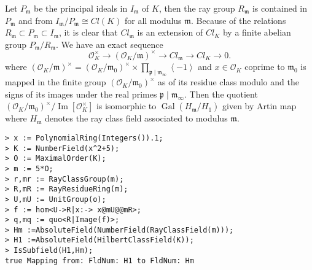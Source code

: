 \documentclass{article}
\theoremstyle{break}
\def\Gal{\mathop{\mathrm{Gal}}\nolimits}
\def\Gal{\mathop{\mathrm{Gal}}\nolimits}
\def\im{\mathop{\mathrm{Im}}\nolimits}
\def\Frob{\mathop{\mathrm{Frob}}\nolimits}
\def\Gal{\mathop{\mathrm{Gal}}\nolimits}
\begin{document}
Let $P_{\mathfrak{m}}$ be the principal ideals in $I_{\mathfrak{m}}$ of $K$, then the ray group $R_{\mathfrak{m}}$ is contained in $P_{\mathfrak{m}}$ and from \cite{Cohen1} $I_{\mathfrak{m}}/P_{\mathfrak{m}}\cong Cl(K)$ for all modulus $\mathfrak{m}$. Because of the relations $R_{\mathfrak{m}}\subset P_{\mathfrak{m}} \subset I_{\mathfrak{m}}$, it is clear that $Cl_{\mathfrak{m}}$ is an extension of $Cl_{K}$ by a finite abelian group $P_{\mathfrak{m}}/R_{\mathfrak{m}}$. We have an exact sequence
\[\mathcal{O}^{\times}_{K} \rightarrow (\mathcal{O}_{K}/{\mathfrak{m}})^{\times} \rightarrow Cl_{\mathfrak{m}} \rightarrow Cl_{K} \rightarrow 0 . \]
where $ (\mathcal{O}_{K}/{\mathfrak{m}})^{\times} = (\mathcal{O}_{K}/{\mathfrak{m}_{0}})^{\times} \times \prod_{\mathfrak{p}\mid \mathfrak{m}_{\infty}}^{}\left\langle -1 \right\rangle$ and $x\in \mathcal{O}_{K}$ coprime to $\mathfrak{m}_{0}$ is mapped in the finite group $ (\mathcal{O}_{K}/{\mathfrak{m}_{0}})^{\times}$ as of its residue class modulo and the signs of its images under the real primes $\mathfrak{p}\mid \mathfrak{m}_{\infty}$. Then the quotient $(\mathcal{O}_{K}/{\mathfrak{m}_{0}})^{\times}/ \im[\mathcal{O}^{\times}_{K}]$  is isomorphic to $\Gal(H_{\mathfrak{m}}/H_{1}) $ given by Artin map where $H_{\mathfrak{m}}$ denotes the ray class field associated to modulus $\mathfrak{m}$.\\
\begin{lstlisting}
> x := PolynomialRing(Integers()).1;
> K := NumberField(x^2+5);
> O := MaximalOrder(K);
> m := 5*O;
> r,mr := RayClassGroup(m);    
> R,mR := RayResidueRing(m);
> U,mU := UnitGroup(o);
> f := hom<U->R|x:-> x@mU@@mR>;
> q,mq := quo<R|Image(f)>;
> Hm :=AbsoluteField(NumberField(RayClassField(m)));
> H1 :=AbsoluteField(HilbertClassField(K));
> IsSubfield(H1,Hm);
true Mapping from: FldNum: H1 to FldNum: Hm

\end{lstlisting}
\end{document}
